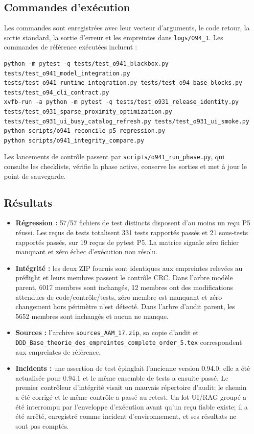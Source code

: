 \documentclass[11pt,a4paper]{article}
\begin{document}
\subsection{Commandes d'exécution}
Les commandes sont enregistrées avec leur vecteur d'arguments, le code retour, la sortie standard, la sortie d'erreur et les empreintes dans \texttt{logs/O94\_1}. Les commandes de référence exécutées incluent :
\begin{verbatim}
python -m pytest -q tests/test_o941_blackbox.py tests/test_o941_model_integration.py tests/test_o941_runtime_integration.py tests/test_o94_base_blocks.py tests/test_o94_cli_contract.py
xvfb-run -a python -m pytest -q tests/test_o931_release_identity.py tests/test_o931_sparse_proximity_optimization.py tests/test_o931_ui_busy_catalog_refresh.py tests/test_o931_ui_smoke.py
python scripts/o941_reconcile_p5_regression.py
python scripts/o941_integrity_compare.py
\end{verbatim}
Les lancements de contrôle passent par \texttt{scripts/o941\_run\_phase.py}, qui consulte les checklists, vérifie la phase active, conserve les sorties et met à jour le point de sauvegarde.

\subsection{Résultats}
\begin{itemize}
\item \textbf{Régression :} 57/57 fichiers de test distincts disposent d'au moins un reçu P5 réussi. Les reçus de tests totalisent 331 tests rapportés passés et 21 sous-tests rapportés passés, sur 19 reçus de pytest P5. La matrice signale zéro fichier manquant et zéro échec d'exécution non résolu.
\item \textbf{Intégrité :} les deux ZIP fournis sont identiques aux empreintes relevées au préflight et leurs membres passent le contrôle CRC. Dans l'arbre modèle parent, 6017 membres sont inchangés, 12 membres ont des modifications attendues de code/contrôle/tests, zéro membre est manquant et zéro changement hors périmètre n'est détecté. Dans l'arbre d'audit parent, les 5652 membres sont inchangés et aucun ne manque.
\item \textbf{Sources :} l'archive \texttt{sources\_AAM\_17.zip}, sa copie d'audit et \texttt{DDD\_Base\_theorie\_des\_empreintes\_complete\_order\_5.tex} correspondent aux empreintes de référence.
\item \textbf{Incidents :} une assertion de test épinglait l'ancienne version 0.94.0; elle a été actualisée pour 0.94.1 et le même ensemble de tests a ensuite passé. Le premier contrôleur d'intégrité visait un mauvais répertoire d'audit; le chemin a été corrigé et le même contrôle a passé au retest. Un lot UI/RAG groupé a été interrompu par l'enveloppe d'exécution avant qu'un reçu fiable existe; il a été arrêté, enregistré comme incident d'environnement, et ses résultats ne sont pas comptés.
\end{itemize}
\end{document}
